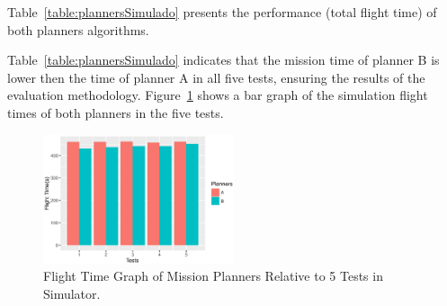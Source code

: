 \documentclass[conference,harvard,brazil,english]{sbatex}
\begin{document}
Table~\ref{table:plannersSimulado} presents the performance (total flight time) of both planners algorithms.
\begin{table}[H]
\centering
\caption{Mission Planners Flight Time - Simulator.\label{table:plannersSimulado}}
\end{table}

Table~\ref{table:plannersSimulado} indicates that the mission time of planner B is lower then the time of planner A in all five tests, ensuring the results of the evaluation methodology. Figure~\ref{fig:GraPlannersSimulado} shows a bar graph of the simulation flight times of both planners in the five tests.

\begin{figure}[H]
	\centering
	\includegraphics[width=0.5\textwidth]{GraPlannersSimulado.eps}
	\caption{Flight Time Graph of Mission Planners Relative to 5 Tests in Simulator.\label{fig:GraPlannersSimulado}}
	\end{figure}
	
\end{document}
